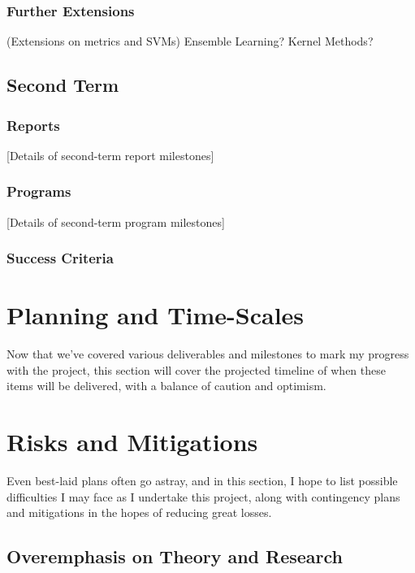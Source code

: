 \documentclass[report,10pt]{article}
\begin{document}
\subsubsection{Further Extensions}
(Extensions on metrics and SVMs) Ensemble Learning? Kernel Methods?

\subsection{Second Term}
\subsubsection{Reports}
[Details of second-term report milestones]

\subsubsection{Programs}
[Details of second-term program milestones]

\subsubsection{Success Criteria}
\pagebreak
\section{Planning and Time-Scales}
Now that we've covered various deliverables and milestones to mark my progress with the project, this section will cover the projected timeline of when these items will be delivered, with a balance of caution and optimism.
\pagebreak
\section{Risks and Mitigations}
Even best-laid plans often go astray, and in this section, I hope to list possible difficulties I may face as I undertake this project, along with contingency plans and mitigations in the hopes of reducing great losses.
\subsection{Overemphasis on Theory and Research}
\end{document}
